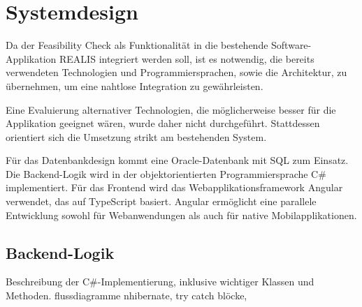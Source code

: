 \chapter{Systemdesign}

Da der Feasibility Check als Funktionalität in die bestehende Software-Applikation \gls{REALIS} integriert werden soll, ist es notwendig, die bereits verwendeten Technologien und Programmiersprachen, sowie die Architektur, zu übernehmen, um eine nahtlose Integration zu gewährleisten.

Eine Evaluierung alternativer Technologien, die möglicherweise besser für die Applikation geeignet wären, wurde daher nicht durchgeführt. Stattdessen orientiert sich die Umsetzung strikt am bestehenden System.

Für das Datenbankdesign kommt eine Oracle-Datenbank mit SQL zum Einsatz. Die Backend-Logik wird in der objektorientierten Programmiersprache C\# implementiert. Für das Frontend wird das Webapplikationsframework Angular verwendet, das auf TypeScript basiert. Angular ermöglicht eine parallele Entwicklung sowohl für Webanwendungen als auch für native Mobilapplikationen.







\section{Backend-Logik}
Beschreibung der C\#-Implementierung, inklusive wichtiger Klassen und Methoden.
flussdiagramme
nhibernate, try catch blöcke, 

